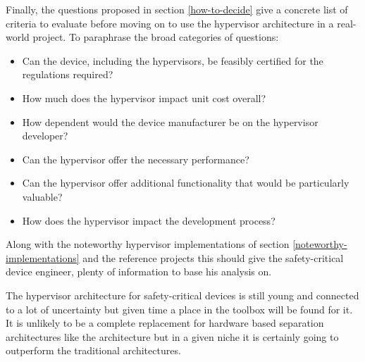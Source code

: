 Finally, the questions proposed in section \ref{how-to-decide} give a concrete list of criteria to evaluate before moving on to use the hypervisor architecture in a real-world project. To paraphrase the broad categories of questions:
\begin{itemize}
    \item Can the device, including the hypervisors, be feasibly certified for the regulations required?
    \item How much does the hypervisor impact unit cost overall?
    \item How dependent would the device manufacturer be on the hypervisor developer?
    \item Can the hypervisor offer the necessary performance?
    \item Can the hypervisor offer additional functionality that would be particularly valuable?
    \item How does the hypervisor impact the development process?
\end{itemize}
Along with the noteworthy hypervisor implementations of section \ref{noteworthy-implementations} and the reference projects this should give the safety-critical device engineer, plenty of information to base his analysis on. 

The hypervisor architecture for safety-critical devices is still young and connected to a lot of uncertainty but given time a place in the toolbox will be found for it. It is unlikely to be a complete replacement for hardware based separation architectures like the  architecture but in a given niche it is certainly going to outperform the traditional architectures.


\begin{comment} 
* Mixed criticality has been present for a long time in very complex projects but with increased processing power and user demands it makes more and more sense in smaller devices.
* For this reason and because of efforts in some industries to save SWaP alternate solutions to the mixed criticality problem have been seeing some adoption.
* One of these is the hypervisor that this thesis set out to compare more in-depth.
* From that comparison the crucial differences and their effects emerged
* [Refer to conclusion from that section]
* Based on this some reference project have been proposed that can be categorized into these [] categories.
* Ultimately it can be said the hypervisor has a couple of very promising places of application.
* So it can be said the best scenarios for the hypervisor architecture are the ones where this happens: []
* The advent of microkernel based safety hypervisors along with the maturation in virtualization technology, especially in the embedded space provides an avenue to deal with the problems that arise from mixed criticality.
\end{comment}
